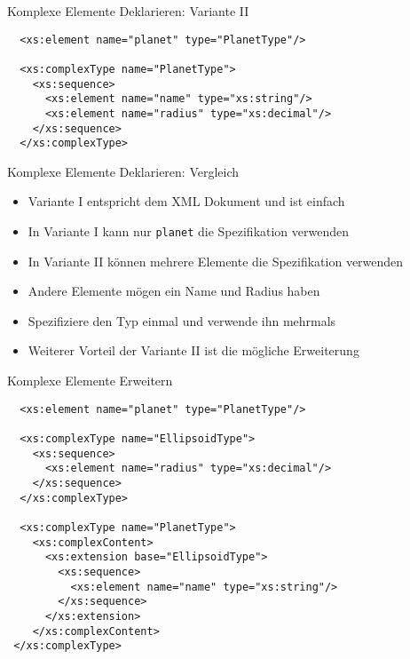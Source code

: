 \documentclass{beamer}
\begin{document}
\begin{frame}[fragile]{Komplexe Elemente Deklarieren: Variante II}
	
	\lstset{language=XML}
	\begin{lstlisting}	
  <xs:element name="planet" type="PlanetType"/>
	
  <xs:complexType name="PlanetType">
    <xs:sequence>
      <xs:element name="name" type="xs:string"/>
      <xs:element name="radius" type="xs:decimal"/>
    </xs:sequence>
  </xs:complexType>
	\end{lstlisting}
	
\end{frame}

\begin{frame}{Komplexe Elemente Deklarieren: Vergleich}
	
	\begin{itemize}
		\item Variante I entspricht dem XML Dokument und ist einfach
		\item In Variante I kann nur \texttt{planet} die Spezifikation verwenden
		\item In Variante II können mehrere Elemente die Spezifikation verwenden
		\item Andere Elemente mögen ein Name und Radius haben
		\item Spezifiziere den Typ einmal und verwende ihn mehrmals
		\item Weiterer Vorteil der Variante II ist die mögliche Erweiterung
	\end{itemize}
	
\end{frame}

\begin{frame}[fragile]{Komplexe Elemente Erweitern}
	
	\small
	\lstset{language=XML}
	\begin{lstlisting}	
  <xs:element name="planet" type="PlanetType"/>
	
  <xs:complexType name="EllipsoidType">
    <xs:sequence>
      <xs:element name="radius" type="xs:decimal"/>
    </xs:sequence>
  </xs:complexType>
  
  <xs:complexType name="PlanetType">
    <xs:complexContent>
      <xs:extension base="EllipsoidType">
        <xs:sequence>
          <xs:element name="name" type="xs:string"/>
        </xs:sequence>
      </xs:extension>
    </xs:complexContent>
 </xs:complexType>
	\end{lstlisting}
	
\end{frame}
\end{document}
